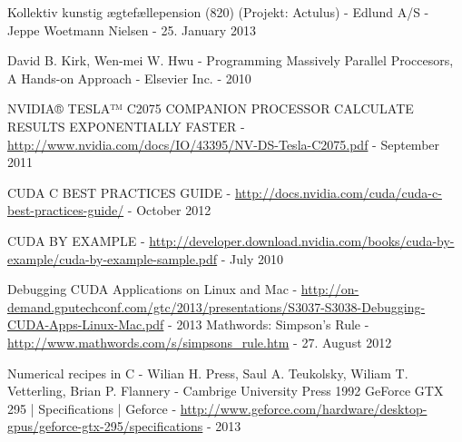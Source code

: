\documentclass[oribibl]{llncs}
\numberwithin{equation}{section}
\begin{document}
	\begin{thebibliography}{9}
			 Kollektiv kunstig ægtefællepension (820) (Projekt: Actulus) - Edlund A/S - Jeppe Woetmann Nielsen - 25. January 2013 
			
			 David B. Kirk, Wen-mei W. Hwu - Programming Massively Parallel Proccesors, A Hands-on Approach - Elsevier Inc. - 2010
			
			 NVIDIA® TESLA™ C2075 COMPANION PROCESSOR CALCULATE RESULTS EXPONENTIALLY FASTER  - \url{http://www.nvidia.com/docs/IO/43395/NV-DS-Tesla-C2075.pdf} - September 2011
			
			 CUDA C BEST PRACTICES GUIDE - \url{http://docs.nvidia.com/cuda/cuda-c-best-practices-guide/} - October 2012
			
			 CUDA BY EXAMPLE - \url{http://developer.download.nvidia.com/books/cuda-by-example/cuda-by-example-sample.pdf} - July 2010
			
			 Debugging CUDA Applications on Linux and Mac - \url{http://on-demand.gputechconf.com/gtc/2013/presentations/S3037-S3038-Debugging-CUDA-Apps-Linux-Mac.pdf} - 2013
			 Mathwords: Simpson's Rule - \url{http://www.mathwords.com/s/simpsons_rule.htm} - 27. August 2012
			
			 Numerical recipes in C - Wilian H. Press, Saul A. Teukolsky, Wiliam T. Vetterling, Brian P. Flannery - Cambrige University Press 1992
			 GeForce GTX 295 | Specifications | Geforce - \url{http://www.geforce.com/hardware/desktop-gpus/geforce-gtx-295/specifications} - 2013
	\end{thebibliography}
	
	
	
\end{document}
